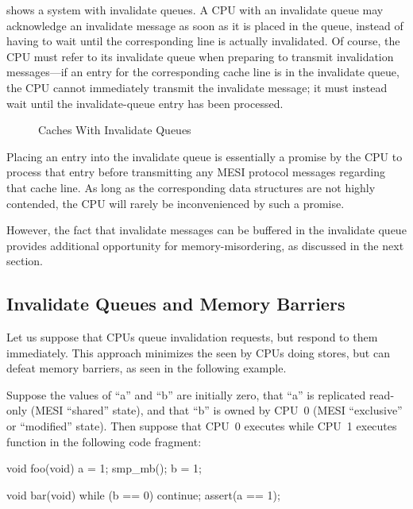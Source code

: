 shows a system with invalidate queues.
A CPU with an invalidate queue may acknowledge an invalidate message
as soon as it is placed in the queue, instead of having to wait until
the corresponding line is actually invalidated.
Of course, the CPU must refer to its invalidate queue when preparing
to transmit invalidation messages---if an entry for the corresponding
cache line is in the invalidate queue, the CPU cannot immediately
transmit the invalidate message; it must instead wait until the
invalidate-queue entry has been processed.

\begin{figure}
\centering
{}
\caption{Caches With Invalidate Queues}
\label{fig:app:whymb:Caches With Invalidate Queues}
\end{figure}

Placing an entry into the invalidate queue is essentially a promise
by the CPU to process that entry before transmitting any MESI protocol
messages regarding that cache line.
As long as the corresponding data structures are not highly contended,
the CPU will rarely be inconvenienced by such a promise.

However, the fact that invalidate messages can be buffered in the
invalidate queue provides additional opportunity for memory-misordering,
as discussed in the next section.

\subsection{Invalidate Queues and Memory Barriers}
\label{sec:app:whymb:Invalidate Queues and Memory Barriers}

Let us suppose that CPUs queue invalidation requests, but respond to
them immediately.
This approach minimizes the  seen by CPUs
doing stores, but can defeat memory barriers, as seen in the following
example.

Suppose the values of ``a'' and ``b'' are initially zero,
that ``a'' is replicated read-only (MESI ``shared'' state),
and that ``b''
is owned by CPU~0 (MESI ``exclusive'' or ``modified'' state).
Then suppose that CPU~0 executes  while CPU~1 executes
function  in the following code fragment:

\begin{fcvlabel}
\begin{VerbatimN}[fontsize=\footnotesize,samepage=true,commandchars=\\\[\]]
void foo(void)
{
	a = 1;
	smp_mb();	\lnlbl[mb]
	b = 1;
}

void bar(void)
{
	while (b == 0) continue;
	assert(a == 1);
}
\end{VerbatimN}
\end{fcvlabel}

